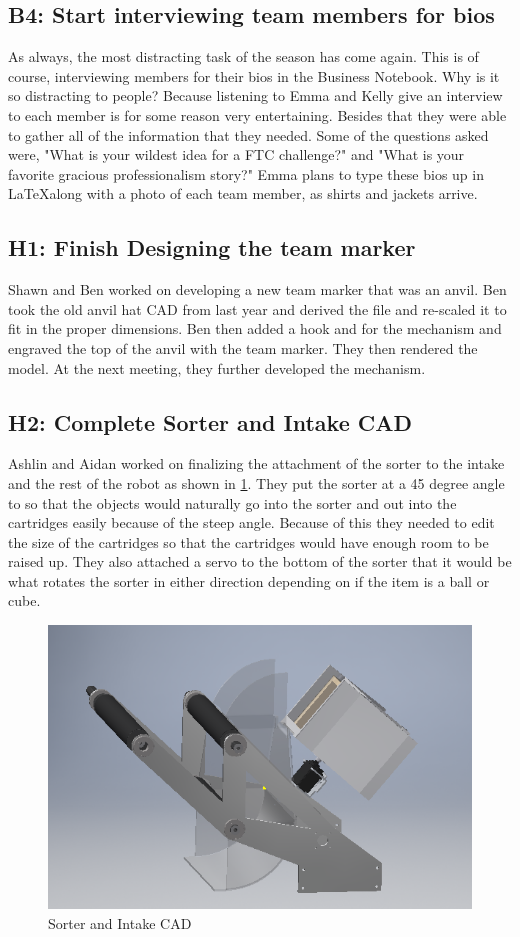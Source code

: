 \documentclass{article}
\begin{document}
\subsection{B4: Start interviewing team members for bios}

As always, the most distracting task of the season has come again. This is of course, interviewing members for their bios in the Business Notebook. Why is it so distracting to people? Because listening to Emma and Kelly give an interview to each member is for some reason very entertaining. Besides that they were able to gather all of the information that they needed. Some of the questions asked were, "What is your wildest idea for a FTC challenge?" and "What is your favorite gracious professionalism story?" Emma plans to type these bios up in \LaTeX along with a photo of each team member, as shirts and jackets arrive. 

\subsection{H1: Finish Designing the team marker}

Shawn and Ben worked on developing a new team marker that was an anvil. Ben took the old anvil hat CAD from last year and derived the file and re-scaled it to fit in the proper dimensions. Ben then added a hook and for the mechanism and engraved the top of the anvil with the team marker. They then rendered the model. At the next meeting, they further developed the mechanism.

\subsection{H2: Complete Sorter and Intake CAD}

Ashlin and Aidan worked on finalizing the attachment of the sorter to the intake and the rest of the robot as shown in \ref{fig:Intake CAD}. They put the sorter at a 45 degree angle to so that the objects would naturally go into the sorter and out into the cartridges easily because of the steep angle. Because of this they needed to edit the size of the cartridges so that the cartridges would have enough room to be raised up. They also attached a servo to the bottom of the sorter that it would be what rotates the sorter in either direction depending on if the item is a ball or cube.

\begin{figure}
    \centering
    \includegraphics[width=.6 \textwidth]{07_10-15/images/IntakeCAD.png}
    \caption{Sorter and Intake CAD}
    \label{fig:Intake CAD}
\end{figure}
\end{document}
